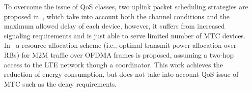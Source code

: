 To overcome the issue of QoS classes, two uplink packet scheduling strategies are proposed in~\cite{lioumpas2011uplink}, which take into account both the channel conditions and the maximum allowed delay of each device, however, it suffers from increased signaling requirements and is just able to serve limited number of MTC devices. In~\cite{YuanHo12} a resource allocation scheme (i.e., optimal transmit power allocation over RBs) for M2M traffic over OFDMA frames is proposed, assuming a two-hop access to the LTE network though a coordinator. This work achieves the reduction of energy consumption, but does not take into account QoS issue of MTC such as the delay requirements.
